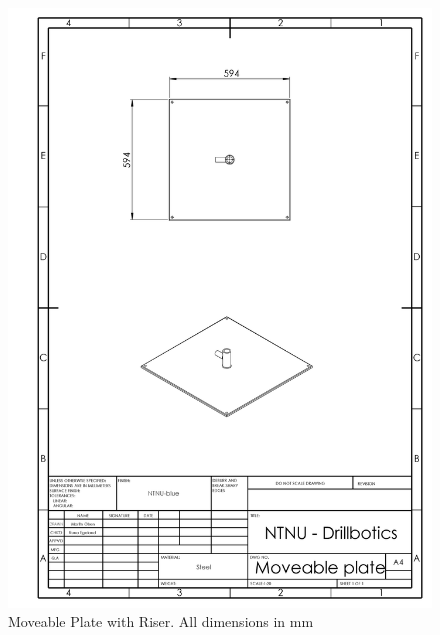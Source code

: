 \newpage
\begin{figure} [H]
\centering
\includegraphics[width=1.0\textwidth]{figures/mechdrawings/Moveableplate.JPG}
\caption{Moveable Plate with Riser. All dimensions in mm} 
\label{fig:riserplate}
\end{figure}


